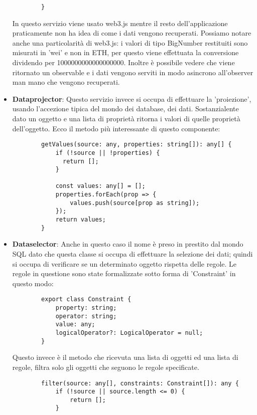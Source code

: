 \begin{itemize}
\begin{lstlisting}
        }
    \end{lstlisting}
    In questo servizio viene usato web3.js mentre il resto dell'applicazione praticamente non ha idea di come i dati vengono recuperati.
    Possiamo notare anche una particolarità di web3.js: i valori di tipo BigNumber restituiti sono misurati in 'wei' e non in ETH, per questo viene effettuata la conversione dividendo per 1000000000000000000.
    Inoltre è possibile vedere che viene ritornato un observable e i dati vengono serviti in modo asincrono all'observer man mano che vengono recuperati.

    \item {\bfseries Dataprojector}: 
    Questo servizio invece si occupa di effettuare la 'proiezione', usando l'accezione tipica del mondo dei database, dei dati.
    Sostanzialente dato un oggetto e una lista di proprietà ritorna i valori di quelle proprietà dell'oggetto.
    Ecco il metodo più interessante di questo componente:
    \begin{lstlisting}
        getValues(source: any, properties: string[]): any[] {
            if (!source || !properties) {
              return [];
            }
        
            const values: any[] = [];
            properties.forEach(prop => {
                values.push(source[prop as string]);
            });
            return values;
        }
    \end{lstlisting}

    \item {\bfseries Dataselector}: 
    Anche in questo caso il nome è preso in prestito dal mondo SQL dato che questa classe si occupa di effettuare la selezione dei dati;
    quindi si occupa di verificare se un determinato oggetto rispetta delle regole. 
    Le regole in questione sono state formalizzate sotto forma di 'Constraint' in questo modo:

    \begin{lstlisting}
        export class Constraint {
            property: string;
            operator: string;
            value: any;
            logicalOperator?: LogicalOperator = null;
        }
    \end{lstlisting}

    Questo invece è il metodo che ricevuta una lista di oggetti ed una lista di regole, filtra solo gli oggetti che seguono le regole specificate.
    \begin{lstlisting}
        filter(source: any[], constraints: Constraint[]): any {
            if (!source || source.length <= 0) {
                return [];
            }
        

\end{lstlisting}
\end{itemize}

